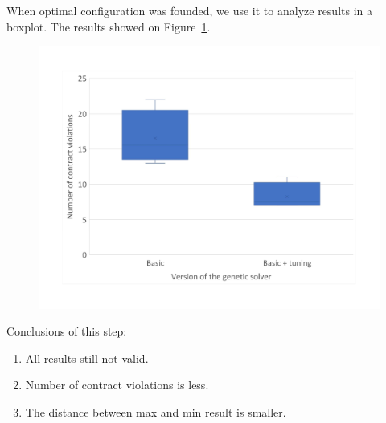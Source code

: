 When optimal configuration was founded, we use it to analyze results in a boxplot.
The results showed on Figure~\ref{fig:boxplotsolverbasictuning}.
\begin{figure}
	\centering
	\includegraphics[width=\textwidth]{images/BoxPlotSolverBasicTuning}
	\caption[Boxplot with a number of contract violations for the basic version of genetic solver and with tuned parameters]{}
	\label{fig:boxplotsolverbasictuning}
\end{figure}

Conclusions of this step:
\begin{enumerate}
	\item All results still not valid.
	\item Number of contract violations is less.
	\item The distance between max and min result is smaller.
\end{enumerate}

